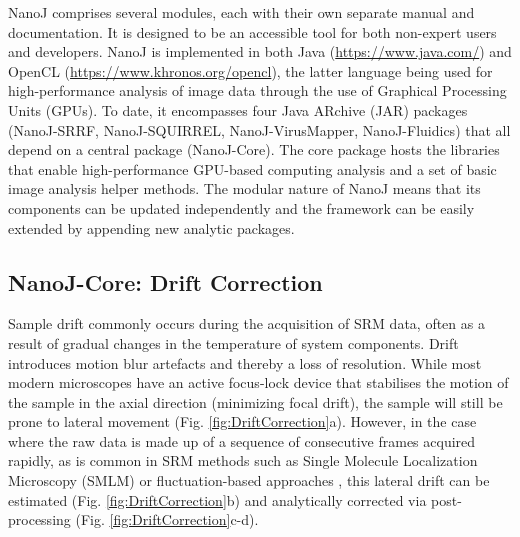 NanoJ comprises several modules, each with their own separate manual and documentation. It is designed to be an accessible tool for both non-expert users and developers. NanoJ is implemented in both Java (\href{https://www.java.com/}{https://www.java.com/}) and OpenCL (\href{https://www.khronos.org/opencl}{https://www.khronos.org/opencl}), the latter language being used for high-performance analysis of image data through the use of Graphical Processing Units (GPUs). To date, it encompasses four Java ARchive (JAR) packages (NanoJ-SRRF, NanoJ-SQUIRREL, NanoJ-VirusMapper, NanoJ-Fluidics) that all depend on a central package (NanoJ-Core). The core package hosts the libraries that enable high-performance GPU-based computing analysis and a set of basic image analysis helper methods. The modular nature of NanoJ means that its components can be updated independently and the framework can be easily extended by appending new analytic packages.

\subsection*{NanoJ-Core: Drift Correction}
Sample drift commonly occurs during the acquisition of SRM data, often as a result of gradual changes in the temperature of system components. Drift introduces motion blur artefacts and thereby a loss of resolution. While most modern microscopes have an active focus-lock device that stabilises the motion of the sample in the axial direction (minimizing focal drift), the sample will still be prone to lateral movement (Fig. \ref{fig:DriftCorrection}a). However, in the case where the raw data is made up of a sequence of consecutive frames acquired rapidly, as is common in SRM methods such as Single Molecule Localization Microscopy (SMLM) \cite{betzig2006imaging,rust2006sub} or fluctuation-based approaches \cite{gustafsson2016fast,dertinger2009fast,cox2012bayesian}, this lateral drift can be estimated (Fig. \ref{fig:DriftCorrection}b) and analytically corrected via post-processing (Fig. \ref{fig:DriftCorrection}c-d).
 

